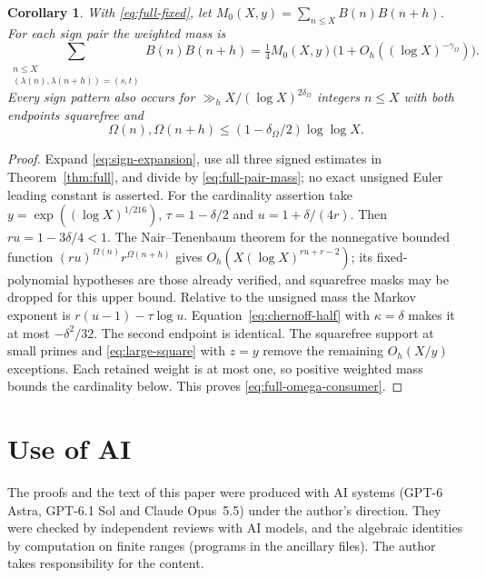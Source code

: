 \documentclass[11pt]{article}
\newtheorem{corollary}[theorem]{Corollary}
\theoremstyle{definition}
\theoremstyle{remark}
\numberwithin{equation}{section}
\begin{document}
\begin{corollary}\label{cor:full-patterns}
With \eqref{eq:full-fixed}, let $M_0(X,y)=\sum_{n\le X}B(n)B(n+h)$.
For each sign pair the weighted mass is
\begin{equation}\label{eq:full-pattern-mass}
 \sum_{\substack{n\le X\\(\lambda(n),\lambda(n+h))=(s,t)}}B(n)B(n+h)
 =\tfrac14M_0(X,y)\bigl(1+O_h((\log X)^{-\gamma_\Omega})\bigr).
\end{equation}
Every sign pattern also occurs for $\gg_h X/(\log X)^{2\delta_\Omega}$ integers $n\le X$ with both endpoints
squarefree and
\begin{equation}\label{eq:full-omega-consumer}
 \Omega(n),\Omega(n+h)\le(1-\delta_\Omega/2)\log\log X.
\end{equation}
\end{corollary}
\begin{proof}
Expand \eqref{eq:sign-expansion}, use all three signed estimates in Theorem~\ref{thm:full}, and divide by
\eqref{eq:full-pair-mass}; no exact unsigned Euler leading constant is asserted.
For the cardinality assertion take $y=\exp((\log X)^{1/216})$, $\tau=1-\delta/2$ and $u=1+\delta/(4r)$.
Then $ru=1-3\delta/4<1$. The Nair--Tenenbaum theorem for the nonnegative bounded function
$(ru)^{\Omega(n)}r^{\Omega(n+h)}$ gives
$O_h(X(\log X)^{ru+r-2})$; its fixed-polynomial hypotheses are those already verified, and squarefree masks
may be dropped for this upper bound.
Relative to the unsigned mass the Markov exponent is $r(u-1)-\tau\log u$.
Equation~\eqref{eq:chernoff-half} with $\kappa=\delta$ makes it at most $-\delta^2/32$.
The second endpoint is identical. The squarefree support at small primes and \eqref{eq:large-square} with $z=y$
remove the remaining $O_h(X/y)$ exceptions. Each retained weight is at most one, so positive weighted mass
bounds the cardinality below. This proves \eqref{eq:full-omega-consumer}.
\end{proof}




\section*{Use of AI}
The proofs and the text of this paper were produced with AI systems (GPT-6 Astra, GPT-6.1 Sol and Claude
Opus~5.5) under the author's direction. They were checked by independent reviews with AI models, and the
algebraic identities by computation on finite ranges (programs in the ancillary files). The author takes
responsibility for the content.
\end{document}
